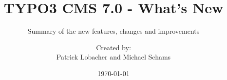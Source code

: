 %

%
%

\documentclass[t]{beamer}

\beamertemplatenavigationsymbolsempty

{
	\usetheme{typo3slides}
}

\title{TYPO3 CMS 7.0 - What's New}
\subtitle{Summary of the new features, changes and improvements}
\author{
	\centerline{Created by:}
	\centerline{Patrick Lobacher and Michael Schams}
}

\date{\today}



\sharefont


\begingroup
	[default]
	\begin{frame}
		\titlepage
	\end{frame}
\endgroup



\section*{TYPO3 CMS 7.0 - What's New}
\begin{frame}[fragile]
	\frametitle{Chapter Overview}
	\framesubtitle{Chapter Overview}

	\begin{multicols}{2}
		\tableofcontents
	\end{multicols}

\end{frame}

